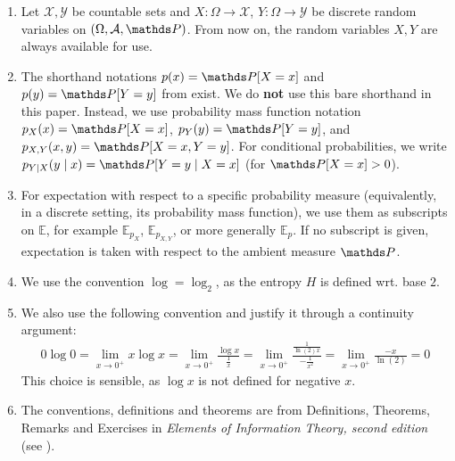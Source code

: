 \begin{remark}
    \begin{enumerate}
    \item
        Let $\mathcal{X}, \mathcal{Y}$ be countable sets and $X: \Omega \rightarrow \mathcal{X}$, $Y: \Omega \rightarrow \mathcal{Y}$ 
        be discrete random variables on $(\Omega, \mathcal{A}, \prob)$.
        From now on, the random variables $X, Y$ are always available for use.

    \item
        The shorthand notations $p(x) = \prob[X = x]$ and $p(y) = \prob[Y = y]$
        from \cite{Thomas:ElementsOfInformationTheory} exist.
        We do \textbf{not} use this bare shorthand in this paper.
        Instead, we use probability mass function notation
        $p_X(x) = \prob[X = x]$, $p_Y(y) = \prob[Y = y]$,
        and $p_{X, Y}(x, y) = \prob[X = x, Y = y]$.
        For conditional probabilities, we write
        $p_{Y \mid X}(y \mid x) = \prob[Y = y \mid X = x]$ (for $\prob[X = x] > 0$).

    \item
        For expectation with respect to a specific probability measure
        (equivalently, in a discrete setting, its probability mass function),
        we use them as subscripts on $\mathbb{E}$,
        for example $\mathbb{E}_{p_X}$, $\mathbb{E}_{p_{X, Y}}$, or more generally $\mathbb{E}_{p}$.
        If no subscript is given, expectation is taken with respect to the ambient measure $\prob$.

    \item We use the convention $\log = \log_2$, as the entropy $H$ is defined wrt. base $2$.

    \item We also use the following convention and justify it through a continuity argument:
        \begin{align*}
            0 \log 0 = \lim_{x \to 0^+}{x \log x}
            = \lim_{x \to 0^+}\frac{\log x}{\frac{1}{x}}
            = \lim_{x \to 0^+}\frac{\frac{1}{\ln(2) x}}{-\frac{1}{x^2}}
            = \lim_{x \to 0^+}\frac{-x}{\ln(2)} = 0
        \end{align*}
        This choice is sensible, as $\log x$ is not defined for negative $x$.
    
        \item The conventions, definitions and theorems are from Definitions, Theorems, Remarks and Exercises 
        in \textit{Elements of Information Theory, second edition} (see \cite{Thomas:ElementsOfInformationTheory}).
    \end{enumerate}
\end{remark}

